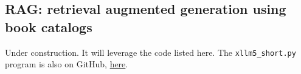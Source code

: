 \documentclass[oneside,10pt]{book}
\begin{document}
\subsection{RAG: retrieval augmented generation using book catalogs}\label{beurreblanc}

Under construction. It will leverage the code listed here. 
The \texttt{xllm5\_short.py} program is also on GitHub, \href{https://github.com/VincentGranville/Large-Language-Models/blob/main/xllm5/xllm5_short.py}{here}.  
\vspace{1ex}


\begin{comment}





crawl itl.nist.gov/div898/handbook/index.htm


## crawl my books char char 
## identify \index{xxx} and \section \subsection \subsubsection ; for each index add list of section / chapters / books
##      use it to complement my LLM

### twitter2.xlsx on google drive, and DSC-master-capri5.xlsx
###                 to predict pageviews
##  Wikipedia directory: wikipedia.org/wiki/Category:Machine_learning (+ indexes)
##       poor : https://en.wikipedia.org/wiki/Category:Statistics

    ## Lemmatization and stemming are the techniques of keyword normalization, while Levenshtein and Soundex are techniques of string matching.
    ##             https://en.wikipedia.org/wiki/Edit_distance
    ##             https://huggingface.co/tasks/sentence-similarity
    ##             https://en.wikipedia.org/wiki/Semantic_similarity
    ### in stackexchange, use tags to extend categoriries // use top words


\end{comment}
\end{document}
